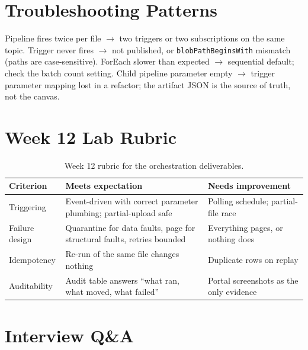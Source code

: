 \section{Troubleshooting Patterns}
Pipeline fires twice per file $\rightarrow$ two triggers or two subscriptions on the same topic. Trigger never fires $\rightarrow$ not published, or \texttt{blobPathBeginsWith} mismatch (paths are case-sensitive). ForEach slower than expected $\rightarrow$ sequential default; check the batch count setting. Child pipeline parameter empty $\rightarrow$ trigger parameter mapping lost in a refactor; the artifact JSON is the source of truth, not the canvas.

\section{Week 12 Lab Rubric}
\begin{table}[H]
\centering
\small
\begin{tabular}{@{}p{3.2cm}p{5.0cm}p{5.0cm}@{}}
\toprule
\textbf{Criterion} & \textbf{Meets expectation} & \textbf{Needs improvement} \\
\midrule
Triggering & Event-driven with correct parameter plumbing; partial-upload safe & Polling schedule; partial-file race \\
Failure design & Quarantine for data faults, page for structural faults, retries bounded & Everything pages, or nothing does \\
Idempotency & Re-run of the same file changes nothing & Duplicate rows on replay \\
Auditability & Audit table answers ``what ran, what moved, what failed'' & Portal screenshots as the only evidence \\
\bottomrule
\end{tabular}
\caption{Week 12 rubric for the orchestration deliverables.}
\label{tab:ch12-rubric}
\end{table}

\section{Interview Q\&A}
